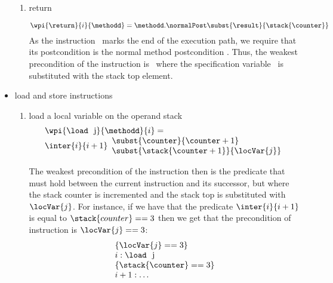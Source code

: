 \begin{itemize}
\begin{enumerate}
 \item return 
 
 $$\wpi{\return}{i}{\methodd}  = \methodd.\normalPost \subst{ \result }{\stack{\counter}}$$
 As the instruction \return \ marks the end of the execution path, we require that its postcondition is the normal method postcondition \normalPost.
 Thus, the weakest precondition of the instruction is \normalPost \ where the specification variable \result \  is substituted with the stack top
 element.

\end{enumerate}






\item  load and store instructions
	\begin{enumerate}
		\item load a local variable on the operand stack \\
		 $$ \begin{array}{l}
                          \wpi{\load \  \mbox{ \rm j}}{ \methodd }{i} =  \\
			  \inter{i}{i+1}\begin{array}{l} 
                                              \subst{\counter}{\counter +1} \\
					      \subst{  \stack{ \counter  + 1}}{\locVar{j}} 
					\end{array}
                    \end{array} $$ 
                
                The weakest precondition of the instruction then is the predicate that must hold between the current instruction
                and its successor, but where the stack counter is incremented and the stack top is substituted with $\locVar{j}$.
                For instance, if we have that the predicate $\inter{i}{i+1} $ is equal to $ \stack{counter} == 3$ then we get that the precondition of
                instruction is $\locVar{j} == 3$:               
		$$
		\begin{array}{l}
		    \{  \locVar{j} == 3 \} \\
		     i:  \load  \ \mbox{ \rm j} \\
                     \{ \stack{\counter} == 3 \} \\
                     i+1: \ldots 
		 \end{array}
		$$
 		

\end{enumerate}
\end{itemize}

